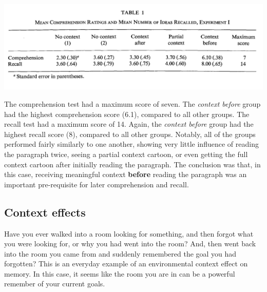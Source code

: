 \documentclass[
  oneside,
  12pt]{crumpbook}
\begin{document}
\begin{center}\includegraphics[width=1\linewidth]{imgs/Bransford_data} \end{center}

The comprehension test had a maximum score of seven. The \emph{context before} group had the highest comprehension score (6.1), compared to all other groups. The recall test had a maximum score of 14. Again, the \emph{context before} group had the highest recall score (8), compared to all other groups. Notably, all of the groups performed fairly similarly to one another, showing very little influence of reading the paragraph twice, seeing a partial context cartoon, or even getting the full context cartoon after initially reading the paragraph. The conclusion was that, in this case, receiving meaningful context \textbf{before} reading the paragraph was an important pre-requisite for later comprehension and recall.

\hypertarget{context-effects}{%
\subsection{Context effects}\label{context-effects}}

Have you ever walked into a room looking for something, and then forgot what you were looking for, or why you had went into the room? And, then went back into the room you came from and suddenly remembered the goal you had forgotten? This is an everyday example of an environmental context effect on memory. In this case, it seems like the room you are in can be a powerful remember of your current goals.
\end{document}
